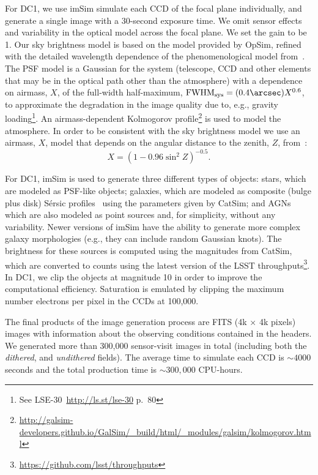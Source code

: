 \documentclass[\docopts]{\docclass}
\begin{document}
For DC1, we use imSim simulate each CCD of the focal plane individually, and generate a single image with a 30-second exposure time. We omit sensor effects and variability in the optical model across the focal plane. We set the gain to be 1. Our sky brightness model is based on the \citet{1991PASP..103.1033K} model provided by OpSim, refined with the detailed wavelength dependence of the phenomenological model from~\citet{2016SPIE.9910E..1AY}. The PSF model is a Gaussian for the system (telescope, CCD and other elements that may be in the optical path other than the atmosphere) with a  dependence on airmass, $X$, of the full-width half-maximum, $\mathrm{FWHM_{sys}} = (0.4\arcsec) X^{0.6}$, to approximate the degradation in the image quality due to, e.g., gravity loading\footnote{See LSE-30~\url{http://ls.st/lse-30} p.~80}. An airmass-dependent Kolmogorov profile\footnote{\url{http://galsim-developers.github.io/GalSim/_build/html/_modules/galsim/kolmogorov.html}} is used to model the atmosphere. In order to be consistent with the sky brightness model we use an airmass, $X$, model that depends on the angular distance to the zenith, $Z$, from~\citet{1991PASP..103.1033K}:
\begin{equation}
X = (1 - 0.96\sin^{2}{Z})^{-0.5}.
\end{equation}

For DC1, imSim is used to generate three different types of objects: stars, which are modeled as PSF-like objects; galaxies, which are modeled as composite (bulge plus disk) S\'{e}rsic profiles~\citep{1963BAAA....6...41S} using
the parameters given by CatSim; and AGNs which are also modeled as point sources and, for simplicity, without any variability. Newer versions of imSim have the ability to generate more complex galaxy morphologies (e.g., they can include random Gaussian knots). The brightness for these sources is computed using the magnitudes from CatSim, which are converted to counts using the latest version of the LSST throughputs\footnote{\url{https://github.com/lsst/throughputs}}. In DC1, we clip the objects at magnitude 10 in order to improve the computational efficiency. Saturation is emulated by clipping the maximum number electrons per pixel in the CCDs at 100,000.

The final products of the image generation process are FITS (4k $\times$ 4k pixels) images with information about the observing conditions contained in the headers. We generated more than 300,000 sensor-visit images in total (including both the \textit{dithered}, and \textit{undithered} fields). The average time to simulate each CCD is $\sim 4000$ seconds and the total production time is $\sim 300,000$ CPU-hours.
\end{document}
